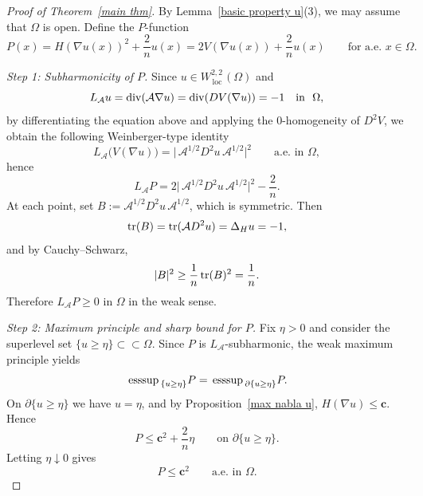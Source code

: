 \documentclass[reqno,11pt]{amsart}
\def\loc{{\mathop\mathrm{\,loc\,}}}
\def\esssup{{\rm \,esssup\,}}
\numberwithin{equation}{section}
\theoremstyle{remark}
\begin{document}
\begin{proof}[Proof of Theorem~\ref{main thm}]
By Lemma~\ref{basic property u}(3), we may assume that $\Omega$ is open. Define the $P$-function
\[
P(x)=H(\nabla u(x))^2+\frac{2}{n}u(x)=2V(\nabla u(x))+\frac{2}{n}u(x)\qquad\text{for a.e.\ }x\in\Omega.
\]

\smallskip
\noindent\emph{Step 1: Subharmonicity of $P$.}
{Since $u\in W^{2,2}_{\loc}(\Omega)$ and}
$$
{L_{\mathcal A}u={\rm div}(\mathcal A\nabla u)={\rm div}(DV(\nabla u))=-1 
\quad \text{in } \ \Omega,}
$$  
{by differentiating the equation above and applying the $0$-homogeneity of $D^2V$,  we obtain the following Weinberger-type identity}
\begin{equation}\label{eq:LA-P}
L_{\mathcal A}\bigl(V(\nabla u)\bigr)=\bigl|\,\mathcal A^{1/2}D^2u\,\mathcal A^{1/2}\bigr|^2
\qquad\text{a.e.\ in }\Omega,
\end{equation}
hence
\[
L_{\mathcal A}P
=2\bigl|\,\mathcal A^{1/2}D^2u\,\mathcal A^{1/2}\bigr|^2-\frac{2}{n}.
\]
At each point, set $B:=\mathcal A^{1/2}D^2u\,\mathcal A^{1/2}$, which is symmetric. Then
\[
{\rm tr}(B)={\rm tr}(\mathcal A D^2u)=\Delta_H u=-1,
\]
and by Cauchy--Schwarz,
\[
|B|^2 \ge \frac{1}{n}\,{\rm tr}(B)^2=\frac{1}{n}.
\]
Therefore $L_{\mathcal A}P\ge 0$ in $\Omega$ in the weak sense.

\smallskip
\noindent\emph{Step 2: Maximum principle and sharp bound for $P$.}
Fix $\eta>0$ and consider the superlevel set $\{u\ge \eta\}\subset\subset \Omega$. Since $P$ is $L_{\mathcal A}$-subharmonic,
the weak maximum principle yields
\[
\esssup_{\{u\ge \eta\}}P=\esssup_{\partial\{u\ge \eta\}}P.
\]
On $\partial\{u\ge \eta\}$ we have $u=\eta$, and by Proposition~\ref{max nabla u},
$H(\nabla u)\le \mathbf c$. Hence
\[
P \le \mathbf c^2+\frac{2}{n}\eta \qquad\text{on }\partial\{u\ge \eta\}.
\]
Letting $\eta\downarrow 0$ gives
\begin{equation}\label{eq:P-bound}
P\le \mathbf c^2 \qquad\text{a.e.\ in }\Omega.
\end{equation}


\end{proof}
\end{document}
